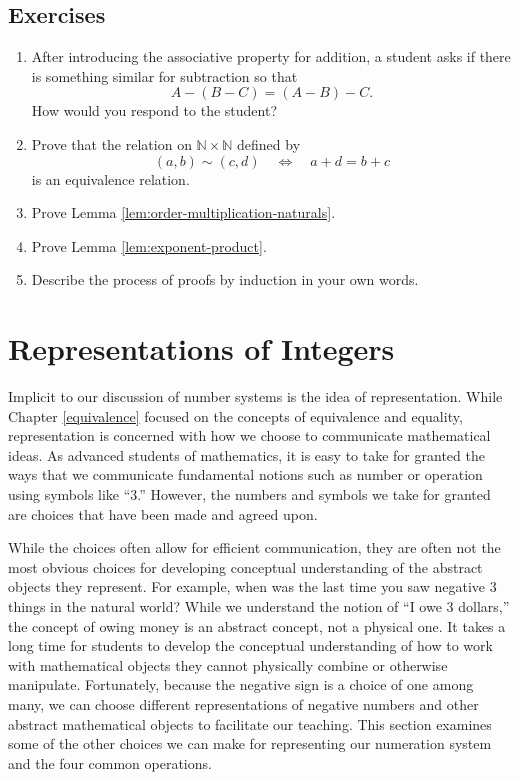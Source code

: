 \documentclass[
]{book}
\let\stdsection\section
\renewcommand\section{\newpage\stdsection}
\theoremstyle{definition}
\theoremstyle{definition}
\theoremstyle{definition}
\theoremstyle{definition}
\theoremstyle{remark}
\begin{document}
\hypertarget{exercises-9}{%
\subsection{Exercises}\label{exercises-9}}

\begin{enumerate}
\def\labelenumi{\arabic{enumi}.}
\item
  After introducing the associative property for addition, a student asks if there is something similar for subtraction so that
  \[ A-(B-C) = (A-B)-C.\] How would you respond to the student?
\item
  Prove that the relation on \(\mathbb{N}\times\mathbb{N}\) defined by \[(a,b)\sim (c,d) \quad \Leftrightarrow \quad a+d=b+c\] is an equivalence relation.
\item
  Prove Lemma \ref{lem:order-multiplication-naturals}.
\item
  Prove Lemma \ref{lem:exponent-product}.
\item
  Describe the process of proofs by induction in your own words.
\end{enumerate}

\hypertarget{integer-representation}{%
\section{Representations of Integers}\label{integer-representation}}

Implicit to our discussion of number systems is the idea of representation. While Chapter \ref{equivalence} focused on the concepts of equivalence and equality, representation is concerned with how we choose to communicate mathematical ideas. As advanced students of mathematics, it is easy to take for granted the ways that we communicate fundamental notions such as number or operation using symbols like ``3.'' However, the numbers and symbols we take for granted are choices that have been made and agreed upon.

While the choices often allow for efficient communication, they are often not the most obvious choices for developing conceptual understanding of the abstract objects they represent. For example, when was the last time you saw negative 3 things in the natural world? While we understand the notion of ``I owe 3 dollars,'' the concept of owing money is an abstract concept, not a physical one. It takes a long time for students to develop the conceptual understanding of how to work with mathematical objects they cannot physically combine or otherwise manipulate. Fortunately, because the negative sign is a choice of one among many, we can choose different representations of negative numbers and other abstract mathematical objects to facilitate our teaching. This section examines some of the other choices we can make for representing our numeration system and the four common operations.
\end{document}
